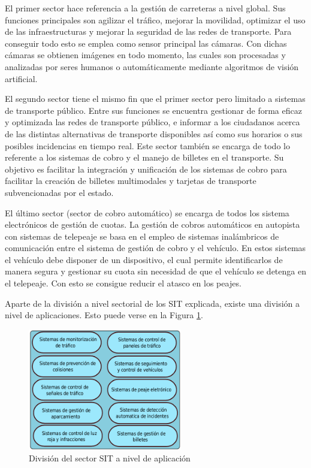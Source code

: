 El primer sector hace referencia a la gestión de carreteras a nivel global. Sus funciones principales son agilizar el tráfico, mejorar la movilidad, optimizar el uso de las infraestructuras y mejorar la seguridad de las redes de transporte. Para conseguir todo esto se emplea como sensor principal las cámaras. Con dichas cámaras se obtienen imágenes en todo momento, las cuales son procesadas y analizadas por seres humanos o automáticamente mediante algoritmos de visión artificial.  

El segundo sector tiene el mismo fin que el primer sector pero limitado a sistemas de transporte público. Entre sus funciones se encuentra gestionar de forma eficaz y optimizada las redes de transporte público, e informar  a los ciudadanos acerca de las distintas alternativas de transporte disponibles así como sus horarios o sus posibles incidencias en tiempo real. Este sector también se encarga de todo lo referente a los sistemas de cobro y el manejo de billetes en el transporte. Su objetivo es facilitar la integración y unificación de los sistemas de cobro para facilitar la creación de billetes multimodales y tarjetas de transporte subvencionadas por el estado.

El último sector (sector de cobro automático) se encarga de todos los sistema electrónicos de gestión de cuotas. La gestión de cobros automáticos en autopista con sistemas de telepeaje se basa en el empleo de sistemas inalámbricos de comunicación entre el sistema de gestión de cobro y el vehículo. En estos sistemas el vehículo debe disponer de un dispositivo, el cual permite identificarlos de manera segura y gestionar su cuota sin necesidad de que el vehículo se detenga en el telepeaje. Con esto se consigue reducir el atasco en los peajes.

Aparte de la división a nivel sectorial de los SIT explicada, existe una división a nivel de aplicaciones. Esto puede verse en la Figura \ref{fig.division_SIT}.

\begin{figure}[H]
  \begin{center}
    \includegraphics[width=0.6\textwidth]{figures/Introduccion/Division_SIT.png}
		\caption{División del sector SIT a nivel de aplicación}
		\label{fig.division_SIT}
		\end{center}
\end{figure}

